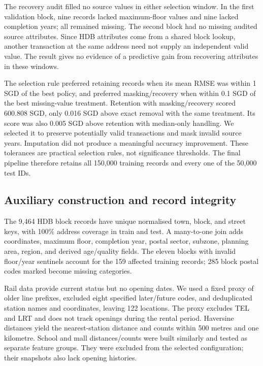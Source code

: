 \documentclass[conference]{IEEEtran}
\newcommand{\field}[1]{\texttt{\detokenize{#1}}}
\begin{document}
The recovery audit filled no source values in either selection window.
In the first validation block, nine records lacked maximum-floor values and
nine lacked completion years; all remained missing. The second block had no
missing audited source attributes. Since HDB attributes come from a shared
block lookup, another transaction at the same address need not supply an
independent valid value. The result gives no evidence of a predictive gain
from recovering attributes in these windows.

The selection rule preferred retaining records when its mean RMSE was within
1 SGD of the best policy, and preferred masking/recovery when within 0.1 SGD
of the best missing-value treatment. Retention with masking/recovery scored
600.808 SGD, only 0.016 SGD above exact removal with the same treatment.
Its score was also 0.005 SGD above retention with median-only handling.
We selected it to preserve potentially valid transactions and mask invalid
source years. Imputation did not produce a meaningful accuracy improvement.
These tolerances are practical selection rules, not significance thresholds.
The final pipeline therefore retains all 150,000 training records and every
one of the 50,000 test IDs.

\subsection{Auxiliary construction and record integrity}
\label{sec:auxiliary_processing}
The 9,464 HDB block records have unique normalised town, block, and street
keys, with 100\% address coverage in train and test. A many-to-one join adds
coordinates, maximum floor, completion year, postal sector, subzone, planning
area, region, and derived age/quality fields. The eleven blocks with invalid
floor/year sentinels account for the 159 affected training records;
285 block postal codes marked \field{NIL} become missing categories.

Rail data provide current status but no opening dates. We used a fixed proxy
of older line prefixes, excluded eight specified later/future codes, and
deduplicated station names and coordinates, leaving 122 locations. The proxy
excludes TEL and LRT and does not track openings during the rental period.
Haversine distances yield the nearest-station distance and counts within
500 metres and one kilometre. School and mall distances/counts were built
similarly and tested as separate feature groups. They were excluded from the
selected configuration; their snapshots also lack opening histories.
\end{document}
